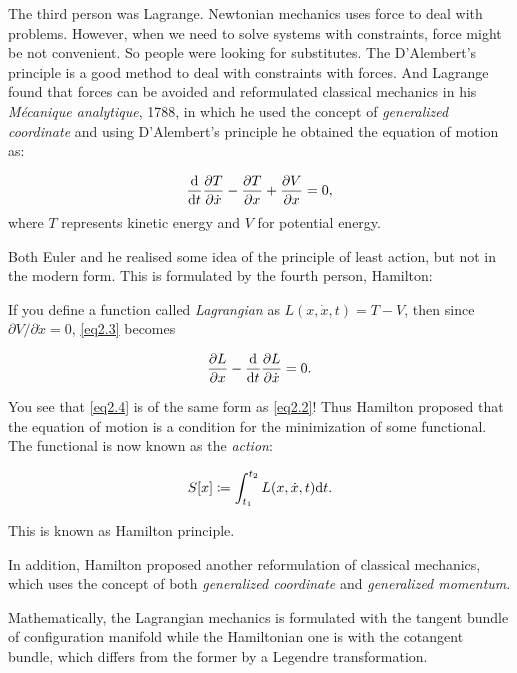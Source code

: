 The third person was Lagrange. Newtonian mechanics uses force to deal with problems. However, when we need to solve systems with constraints, force might be not convenient. So people were looking for substitutes. The D'Alembert's principle is a good method to deal with constraints with forces. And Lagrange found that forces can be avoided and reformulated classical mechanics in his \textit{Mécanique analytique}, 1788, in which he used the concept of \textit{generalized coordinate} and using D'Alembert's principle he obtained the equation of motion as:

\begin{equation}
    \label{eq2.3}
    \frac{\mathrm{d}}{\mathrm{d} t}\frac{\partial T}{\partial \dot{x}} - \frac{\partial T}{\partial x} + \frac{\partial V}{\partial x} = 0,
\end{equation}
where $T$ represents kinetic energy and $V$ for potential energy.

Both Euler and he realised some idea of the principle of least action, but not in the modern form. This is formulated by the fourth person, Hamilton:

If you define a function called \textit{Lagrangian} as $L(x, \dot{x}, t) = T - V$, then since $\partial V/\partial \dot{x} = 0$, \eqref{eq2.3} becomes

\begin{equation}
    \label{eq2.4}
    \frac{\partial L}{\partial x} - \frac{\mathrm{d}}{\mathrm{d} t}\frac{\partial L}{\partial \dot{x}} = 0.
\end{equation}

You see that \eqref{eq2.4} is of the same form as \eqref{eq2.2}! Thus Hamilton proposed that the equation of motion is a condition for the minimization of some functional. The functional is now known as the \textit{action}:

\begin{equation}
    S[x]\coloneqq\int_{t_1}^{t_2}L(x, \dot{x}, t)\mathrm{d} t.
\end{equation}

This is known as Hamilton principle.

In addition, Hamilton proposed another reformulation of classical mechanics, which uses the concept of both \textit{generalized coordinate} and \textit{generalized momentum}.

Mathematically, the Lagrangian mechanics is formulated with the tangent bundle of configuration manifold while the Hamiltonian one is with the cotangent bundle, which differs from the former by a Legendre transformation.

